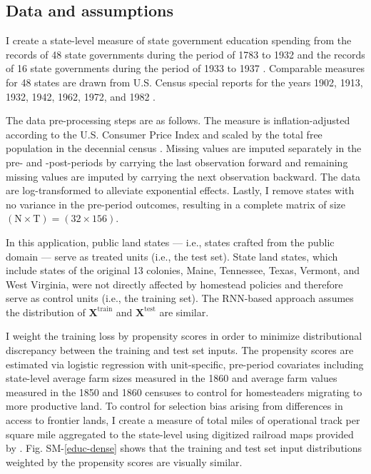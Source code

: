 \subsection{Data and assumptions} \label{educ-data}

I create a state-level measure of state government education spending from the records of 48 state governments during the period of 1783 to 1932 \citep{sylla1993sources} and the records of 16 state governments during the period of 1933 to 1937 \citep{sylla1995sourcesa,sylla1995sourcesb}. Comparable measures for 48 states are drawn from U.S. Census special reports for the years 1902, 1913, 1932, 1942, 1962, 1972, and 1982 \citep{haines2010}.

The data pre-processing steps are as follows. The measure is inflation-adjusted according to the U.S. Consumer Price Index \citep{williamson2017seven} and scaled by the total free population in the decennial census \citep{haines2010}. Missing values are imputed separately in the pre- and -post-periods by carrying the last observation forward and remaining missing values are imputed by carrying the next observation backward. The data are log-transformed to alleviate exponential effects. Lastly, I remove states with no variance in the pre-period outcomes, resulting in a complete matrix of size $(\text{N} \times \text{T})= (32 \times 156)$. 

In this application, public land states --- i.e., states crafted from the public domain --- serve as treated units (i.e., the test set). State land states, which include states of the original 13 colonies, Maine, Tennessee, Texas, Vermont, and West Virginia, were not directly affected by homestead policies and therefore serve as control units (i.e., the training set). The RNN-based approach assumes the distribution of $\boldsymbol{X}^{\text{train}}$ and $\boldsymbol{X}^{\text{test}}$ are similar.

I weight the training loss by  propensity scores in order to minimize distributional discrepancy between the training and test set inputs. The propensity scores are estimated via logistic regression with unit-specific, pre-period covariates including state-level average farm sizes measured in the 1860 and average farm values measured in the 1850 and 1860 censuses \citep{haines2010} to control for homesteaders migrating to more productive land. To control for selection bias arising from differences in access to frontier lands, I create a measure of total miles of operational track per square mile aggregated to the state-level using digitized railroad maps provided by \citet{atack2013use}. Fig. SM-\ref{educ-dense} shows that the training and test set input distributions weighted by the propensity scores are visually similar.%

